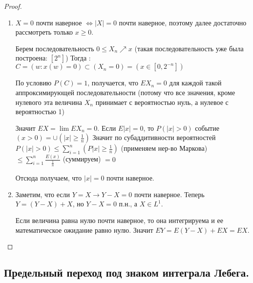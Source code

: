 	\begin{proof}
		\begin{enumerate}
		\item $X = 0$ почти наверное $\iff |X| = 0$ почти наверное, поэтому далее достаточно рассмотреть только $x \geq 0$. 
		  
		 Берем последовательность $0 \leq X_n \nearrow x$ (такая последовательность уже была построена: $[2^n]$)
		 Тогда : 
		 $C = ( w : x(w) = 0) \subset (X_n = 0)  =  (x \in [0, 2^{-n}])$  
		 
		По условию $P(C) = 1$, получается, что $EX_n = 0$ для каждой такой аппроксимирующей последовательности (потому что все значения, кроме нулевого эта величина $X_n$ принимает с вероятностью нуль, а нулевое с вероятностью 1)
		 
		Значит $EX = \lim EX_n = 0$.
		Если $E|x| = 0$, то $P(|x| > 0)$ событие $(x > 0) = \cup (|x| \geq \frac{1}{n})$
		Значит по субаддитивности вероятностей $P(|x| > 0) \leq \sum\limits_{i=1}^n (P|x| \geq \frac{1}{n}) $ (применяем нер-во Маркова) $\leq \sum\limits_{i=1}^n \frac{E(x)}{\frac{1}{n}}$ (суммируем) $=0$
		 
		Отсюда получаем, что $|x| = 0$ почти наверное.
		\item Заметим, что если $Y = X \rightarrow Y - X = 0$ почти наверное.
		Теперь $Y = (Y - X) + X$, но $Y - X = 0$ п.н., а $X \in L^1$. 
		 
		Если величина равна нулю почти наверное, то она интегрируема и ее математическое ожидание равно нулю.
		Значит $EY = E(Y - X) + EX = EX$.
		\end{enumerate}	
	\end{proof}	
	 
	\subsection{Предельный переход под знаком интеграла Лебега.}
	 
